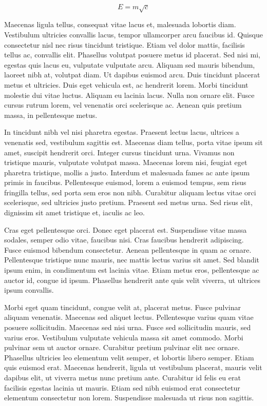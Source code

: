 \documentclass[9pt]{memoir}
\begin{document}
\begin{equation}
E = m \sqrt{c}
\end{equation}

Maecenas ligula tellus, consequat vitae lacus et, malesuada lobortis diam. Vestibulum ultricies convallis lacus, tempor ullamcorper arcu faucibus id. Quisque consectetur nisl nec risus tincidunt tristique. Etiam vel dolor mattis, facilisis tellus ac, convallis elit. Phasellus volutpat posuere metus id placerat. Sed nisi mi, egestas quis lacus eu, vulputate vulputate arcu. Aliquam sed mauris bibendum, laoreet nibh at, volutpat diam. Ut dapibus euismod arcu. Duis tincidunt placerat metus et ultricies. Duis eget vehicula est, ac hendrerit lorem. Morbi tincidunt molestie dui vitae luctus. Aliquam eu lacinia lacus. Nulla non ornare elit. Fusce cursus rutrum lorem, vel venenatis orci scelerisque ac. Aenean quis pretium massa, in pellentesque metus.

In tincidunt nibh vel nisi pharetra egestas. Praesent lectus lacus, ultrices a venenatis sed, vestibulum sagittis est. Maecenas diam tellus, porta vitae ipsum sit amet, suscipit hendrerit orci. Integer cursus tincidunt urna. Vivamus non tristique mauris, vulputate volutpat massa. Maecenas lorem nisi, feugiat eget pharetra tristique, mollis a justo. Interdum et malesuada fames ac ante ipsum primis in faucibus. Pellentesque euismod, lorem a euismod tempus, sem risus fringilla tellus, sed porta sem eros non nibh. Curabitur aliquam lectus vitae orci scelerisque, sed ultricies justo pretium. Praesent sed metus urna. Sed risus elit, dignissim sit amet tristique et, iaculis ac leo.

Cras eget pellentesque orci. Donec eget placerat est. Suspendisse vitae massa sodales, semper odio vitae, faucibus nisi. Cras faucibus hendrerit adipiscing. Fusce euismod bibendum consectetur. Aenean pellentesque in quam ac ornare. Pellentesque tristique nunc mauris, nec mattis lectus varius sit amet. Sed blandit ipsum enim, in condimentum est lacinia vitae. Etiam metus eros, pellentesque ac auctor id, congue id ipsum. Phasellus hendrerit ante quis velit viverra, ut ultrices ipsum convallis.

Morbi eget quam tincidunt, congue velit at, placerat metus. Fusce pulvinar aliquam venenatis. Maecenas sed aliquet lectus. Pellentesque varius quam vitae posuere sollicitudin. Maecenas sed nisi urna. Fusce sed sollicitudin mauris, sed varius eros. Vestibulum vulputate vehicula massa sit amet commodo. Morbi pulvinar sem ut auctor ornare. Curabitur pretium pulvinar elit nec ornare. Phasellus ultricies leo elementum velit semper, et lobortis libero semper. Etiam quis euismod erat. Maecenas hendrerit, ligula ut vestibulum placerat, mauris velit dapibus elit, ut viverra metus nunc pretium ante. Curabitur id felis eu erat facilisis egestas lacinia ut mauris. Etiam sed nibh euismod erat consectetur elementum consectetur non lorem. Suspendisse malesuada ut risus non sagittis.
\end{document}
